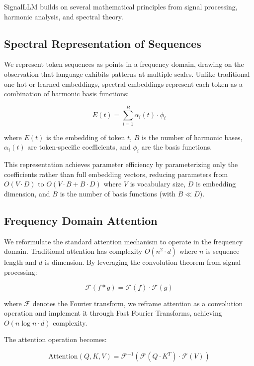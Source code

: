 \documentclass[10pt,twocolumn,letterpaper]{article}
\begin{document}
SignalLLM builds on several mathematical principles from signal processing, harmonic analysis, and spectral theory.

\subsection{Spectral Representation of Sequences}

We represent token sequences as points in a frequency domain, drawing on the observation that language exhibits patterns at multiple scales. Unlike traditional one-hot or learned embeddings, spectral embeddings represent each token as a combination of harmonic basis functions:

\begin{equation}
E(t) = \sum_{i=1}^{B} \alpha_i(t) \cdot \phi_i
\end{equation}

where $E(t)$ is the embedding of token $t$, $B$ is the number of harmonic bases, $\alpha_i(t)$ are token-specific coefficients, and $\phi_i$ are the basis functions.

This representation achieves parameter efficiency by parameterizing only the coefficients rather than full embedding vectors, reducing parameters from $O(V \cdot D)$ to $O(V \cdot B + B \cdot D)$ where $V$ is vocabulary size, $D$ is embedding dimension, and $B$ is the number of basis functions (with $B \ll D$).

\subsection{Frequency Domain Attention}

We reformulate the standard attention mechanism to operate in the frequency domain. Traditional attention has complexity $O(n^2 \cdot d)$ where $n$ is sequence length and $d$ is dimension. By leveraging the convolution theorem from signal processing:

\begin{equation}
\mathcal{F}(f * g) = \mathcal{F}(f) \cdot \mathcal{F}(g)
\end{equation}

where $\mathcal{F}$ denotes the Fourier transform, we reframe attention as a convolution operation and implement it through Fast Fourier Transforms, achieving $O(n \log n \cdot d)$ complexity.

The attention operation becomes:

\begin{equation}
\text{Attention}(Q, K, V) = \mathcal{F}^{-1}(\mathcal{F}(Q \cdot K^T) \cdot \mathcal{F}(V))
\end{equation}
\end{document}
